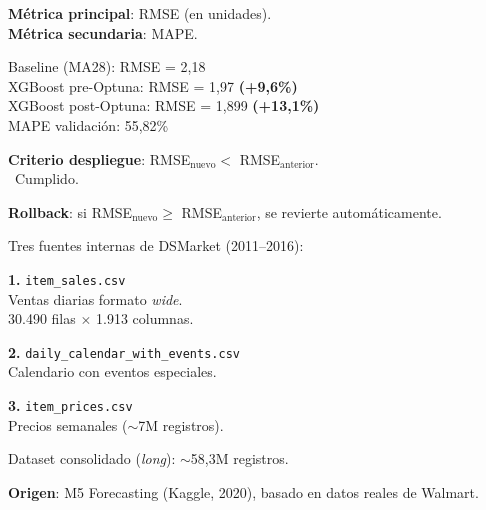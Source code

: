 \documentclass[12pt, a4paper, oneside]{report}
\newcommand{\dataset}[1]{\texttt{\footnotesize\color{codepurple}#1}}
\begin{document}
\noindent
\begin{minipage}[t]{0.485\textwidth}
\begin{tcolorbox}[canvasbox, title={4.\ Impact Simulation}]
\textbf{M\'etrica principal}: RMSE (en unidades).\\
\textbf{M\'etrica secundaria}: MAPE.

\medskip
{\footnotesize\noindent
  Baseline (MA28): RMSE = 2,18\\[2pt]
  XGBoost pre-Optuna: RMSE = 1,97 \textbf{(+9,6\%)}\\[2pt]
  XGBoost post-Optuna: RMSE = 1,899 \textbf{(+13,1\%)}\\[2pt]
  MAPE validaci\'on: 55,82\%
}

\medskip
\textbf{Criterio despliegue}: RMSE$_{\text{nuevo}} <$ RMSE$_{\text{anterior}}$.\\
\checkmark\ Cumplido.

\medskip
\textbf{Rollback}: si RMSE$_{\text{nuevo}} \geq$ RMSE$_{\text{anterior}}$, se revierte autom\'aticamente.
\end{tcolorbox}
\end{minipage}
\hfill
\begin{minipage}[t]{0.485\textwidth}
\begin{tcolorbox}[canvasbox, title={5.\ Data Sources}]
Tres fuentes internas de DSMarket (2011--2016):

\medskip
\textbf{1.} \dataset{item\_sales.csv}\\
Ventas diarias formato \textit{wide}.\\
30.490 filas $\times$ 1.913 columnas.

\medskip
\textbf{2.} \dataset{daily\_calendar\_with\_events.csv}\\
Calendario con eventos especiales.

\medskip
\textbf{3.} \dataset{item\_prices.csv}\\
Precios semanales ($\sim$7M registros).

\medskip
Dataset consolidado (\textit{long}): $\sim$58,3M registros.

\medskip
\textbf{Origen}: M5 Forecasting (Kaggle, 2020), basado en datos reales de Walmart.
\end{tcolorbox}
\end{minipage}

\vspace{0.4cm}
\end{document}
